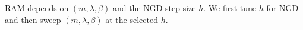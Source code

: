 \documentclass{article} %
\numberwithin{equation}{subsection}
\numberwithin{theorem}{section}
\newcommand{\dd}{\mathrm{d}}
\newcommand{\Id}{\operatorname{Id}}
\newcommand{\rhoref}{{\rho_{\text{ref}}}}
\begin{document}
RAM depends on $(m,\lambda,\beta)$ and the NGD step size $h$. We first tune $h$ for NGD and then sweep $(m,\lambda,\beta)$ at the selected $h$.

    

\end{document}
